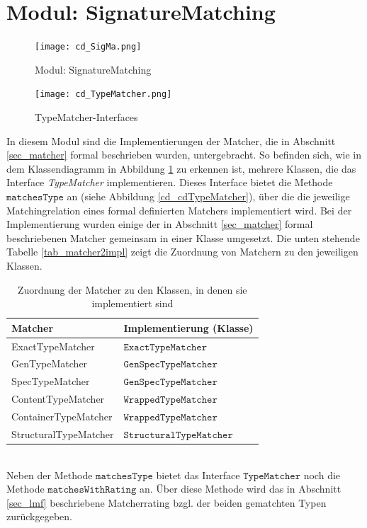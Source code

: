 \section{Modul: SignatureMatching}
\begin{figure}
\texttt{[image: cd\_SigMa.png]}
\caption{Modul: SignatureMatching}
\label{fig_cdSigMa}
\end{figure}
\begin{figure}
\texttt{[image: cd\_TypeMatcher.png]}
\caption{TypeMatcher-Interfaces}
\label{fig_cdTypeMatcher}
\end{figure}
In diesem Modul sind die Implementierungen der Matcher, die in Abschnitt \ref{sec_matcher} formal beschrieben wurden, untergebracht. So befinden sich, wie in dem Klassendiagramm in Abbildung \ref{fig_cdSigMa} zu erkennen ist, mehrere Klassen, die das Interface \emph{TypeMatcher} implementieren. Dieses Interface bietet die Methode $\texttt{matchesType}$ an (siehe Abbildung \ref{cd_cdTypeMatcher}), über die die jeweilige Matchingrelation eines formal definierten Matchers implementiert wird. Bei der Implementierung wurden einige der in Abschnitt \ref{sec_matcher} formal beschriebenen Matcher gemeinsam in einer Klasse umgesetzt. Die unten stehende Tabelle \ref{tab_matcher2impl} zeigt die Zuordnung von Matchern zu den jeweiligen Klassen.
\begin{table}[h!]
\centering
\begin{tabular}{|l|l|}
\hline
\hline
\textbf{Matcher} & \textbf{Implementierung (Klasse)} \\
\hline
ExactTypeMatcher & $\texttt{ExactTypeMatcher}$ \\
\hline
GenTypeMatcher & $\texttt{GenSpecTypeMatcher}$ \\
\hline
SpecTypeMatcher & $\texttt{GenSpecTypeMatcher}$ \\
\hline
ContentTypeMatcher & $\texttt{WrappedTypeMatcher}$ \\
\hline
ContainerTypeMatcher & $\texttt{WrappedTypeMatcher}$ \\
\hline
StructuralTypeMatcher & $\texttt{StructuralTypeMatcher}$ \\
\hline
\hline
\end{tabular}
\caption{Zuordnung der Matcher zu den Klassen, in denen sie implementiert sind}
\end{table}\label{tab_matcher2impl}
\noindent
\\
Neben der Methode $\texttt{matchesType}$ bietet das Interface $\texttt{TypeMatcher}$ noch die Methode $\texttt{matchesWithRating}$ an. Über diese Methode wird das in Abschnitt \ref{sec_lmf} beschriebene Matcherrating bzgl. der beiden gematchten Typen zurückgegeben.
